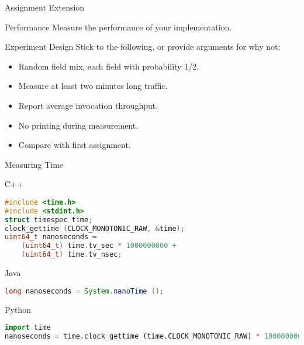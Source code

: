 \begin{frame}{Assignment Extension}
    \begin{block}{Performance}
        Measure the performance of your implementation.
    \end{block}

    \bigskip

    \begin{block}{Experiment Design}
        Stick to the following, or provide arguments for why not:
        \begin{itemize}
            \item Random field mix, each field with probability 1/2.
            \item Measure at least two minutes long traffic.
            \item Report average invocation throughput.
            \item No printing during measurement.
            \item Compare with first assignment.
        \end{itemize}
    \end{block}
\end{frame}


\begin{frame}[fragile]{Measuring Time}
    \begin{block}{C++}
\begin{lstlisting}[language=c,style=mini]
#include <time.h>
#include <stdint.h>
struct timespec time;
clock_gettime (CLOCK_MONOTONIC_RAW, &time);
uint64_t nanoseconds =
    (uint64_t) time.tv_sec * 1000000000 +
    (uint64_t) time.tv_nsec;
\end{lstlisting}
    \end{block}
    \begin{block}{Java}
\begin{lstlisting}[language=java,style=mini]
long nanoseconds = System.nanoTime ();
\end{lstlisting}
    \end{block}
    \begin{block}{Python}
\begin{lstlisting}[language=python,style=mini]
import time
nanoseconds = time.clock_gettime (time.CLOCK_MONOTONIC_RAW) * 1000000000
\end{lstlisting}
    \end{block}
\end{frame}
